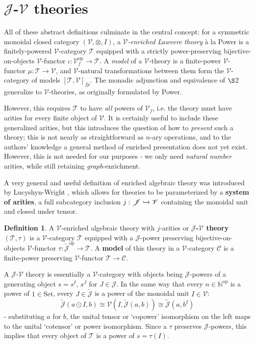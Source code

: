 \documentclass[a4paper,UKenglish]{article}
\theoremstyle{definition}
\newtheorem{definition}{Definition}[section]
\newcommand{\Set}{\mathrm{Set}}
\newcommand{\op}{\mathrm{op}}
\newcommand{\NN}{\mathbb{N}}
\newcommand{\V}{\mathscr{V}}
\newcommand{\C}{\mathscr{C}}
\newcommand{\T}{\mathscr{T}}
\newcommand{\J}{\mathscr{J}}
\begin{document}
\section{$\J$-$\V$ theories}
All of these abstract definitions culminate in the central concept: for a symmetric monoidal closed category $(\V,\otimes,I)$, a \textit{$\V$-enriched Lawvere theory} \`a la Power \cite{power} is a finitely-powered $\V$-category $\T$ equipped with a strictly power-preserving bijective-on-objects $\V$-functor $\iota:\V_f^\op \to \T$. A \textit{model} of a $\V$-theory is a finite-power $\V$-functor $\mu:\T \to \V$, and $\V$-natural transformations between them form the $\V$-category of models $[\T,\V]_{fp}$. The monadic adjunction and equivalence of $\S$2 generalize to $\V$-theories, as originally formulated by Power.

However, this requires $\T$ to have \textit{all} powers of $\V_f$, i.e. the theory must have arities for every finite object of $\V$. It is certainly useful to include these generalized arities, but this introduces the question of how to \textit{present} such a theory; this is not nearly as straightforward as $n$-ary operations, and to the authors' knowledge a general method of enriched presentation does not yet exist. However, this is not needed for our purposes - we only need \textit{natural number} arities, while still retaining \textit{graph}-enrichment.

A very general and useful definition of enriched algebraic theory was introduced by Lucyshyn-Wright \cite{rbb}, which allows for theories to be parameterized by a \textbf{system of arities}, a full subcategory inclusion $j: \J \xhookrightarrow{} \V$ containing the monoidal unit and closed under tensor.

\begin{definition}
	A $\V$-enriched algebraic theory with $j$-arities or \textbf{$\J$-$\V$ theory} $(\T,\tau)$ is a $\V$-category $\T$ equipped with a $\J$-power preserving bijective-on-objects $\V$-functor $\tau:\tilde{\J}^\op \to \T$. A \textbf{model} of this theory in a $\V$-category $\C$ is a finite-power preserving $\V$-functor $\T \to \C$.
\end{definition}

A $\J$-$\V$ theory is essentially a $\V$-category with objects being $\J$-powers of a generating object $s = s^I$, $s^J$ for $J \in \J$. In the same way that every $n\in \NN^\op$ is a power of $1 \in \Set$, every $J\in \tilde{\J}$ is a power of the monoidal unit $I\in \V$: $$\tilde{\J}(a\odot I,b) \cong \V(I, \tilde{\J}(a,b)) \cong \tilde{\J}(a,b^I)$$ - substituting $a$ for $b$, the unital tensor or `copower' isomorphism on the left maps to the unital `cotensor' or power isomorphism. Since a $\tau$ preserves $\J$-powers, this implies that every object of $\T$ is a power of $s = \tau(I)$.
\end{document}
